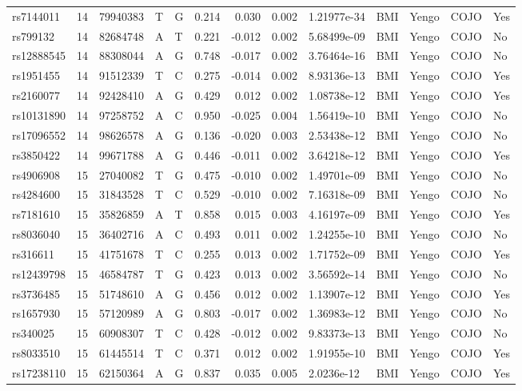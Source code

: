 \documentclass[11pt,twoside]{bristolthesis}
\begin{document}
\begin{longtable}[t]{lrlllrrrlllll}
\addlinespace
rs7144011 & 14 & 79940383 & T & G & 0.214 & 0.030 & 0.002 & 1.21977e-34 & BMI & Yengo & COJO & Yes\\
rs799132 & 14 & 82684748 & A & T & 0.221 & -0.012 & 0.002 & 5.68499e-09 & BMI & Yengo & COJO & No\\
rs12888545 & 14 & 88308044 & A & G & 0.748 & -0.017 & 0.002 & 3.76464e-16 & BMI & Yengo & COJO & No\\
rs1951455 & 14 & 91512339 & T & C & 0.275 & -0.014 & 0.002 & 8.93136e-13 & BMI & Yengo & COJO & Yes\\
rs2160077 & 14 & 92428410 & A & G & 0.429 & 0.012 & 0.002 & 1.08738e-12 & BMI & Yengo & COJO & Yes\\
\addlinespace
rs10131890 & 14 & 97258752 & A & C & 0.950 & -0.025 & 0.004 & 1.56419e-10 & BMI & Yengo & COJO & No\\
rs17096552 & 14 & 98626578 & A & G & 0.136 & -0.020 & 0.003 & 2.53438e-12 & BMI & Yengo & COJO & No\\
rs3850422 & 14 & 99671788 & A & G & 0.446 & -0.011 & 0.002 & 3.64218e-12 & BMI & Yengo & COJO & Yes\\
rs4906908 & 15 & 27040082 & T & G & 0.475 & -0.010 & 0.002 & 1.49701e-09 & BMI & Yengo & COJO & No\\
rs4284600 & 15 & 31843528 & T & C & 0.529 & -0.010 & 0.002 & 7.16318e-09 & BMI & Yengo & COJO & No\\
\addlinespace
rs7181610 & 15 & 35826859 & A & T & 0.858 & 0.015 & 0.003 & 4.16197e-09 & BMI & Yengo & COJO & Yes\\
rs8036040 & 15 & 36402716 & A & C & 0.493 & 0.011 & 0.002 & 1.24255e-10 & BMI & Yengo & COJO & No\\
rs316611 & 15 & 41751678 & T & C & 0.255 & 0.013 & 0.002 & 1.71752e-09 & BMI & Yengo & COJO & Yes\\
rs12439798 & 15 & 46584787 & T & G & 0.423 & 0.013 & 0.002 & 3.56592e-14 & BMI & Yengo & COJO & No\\
rs3736485 & 15 & 51748610 & A & G & 0.456 & 0.012 & 0.002 & 1.13907e-12 & BMI & Yengo & COJO & Yes\\
\addlinespace
rs1657930 & 15 & 57120989 & A & G & 0.803 & -0.017 & 0.002 & 1.36983e-12 & BMI & Yengo & COJO & No\\
rs340025 & 15 & 60908307 & T & C & 0.428 & -0.012 & 0.002 & 9.83373e-13 & BMI & Yengo & COJO & No\\
rs8033510 & 15 & 61445514 & T & C & 0.371 & 0.012 & 0.002 & 1.91955e-10 & BMI & Yengo & COJO & Yes\\
rs17238110 & 15 & 62150364 & A & G & 0.837 & 0.035 & 0.005 & 2.0236e-12 & BMI & Yengo & COJO & Yes\\

\end{longtable}
\end{document}
